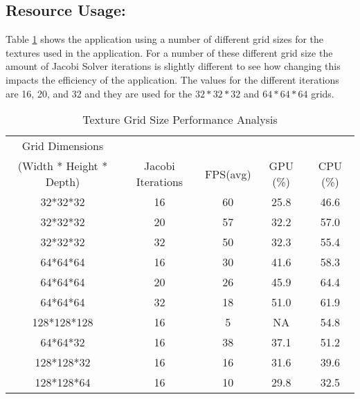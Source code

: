 \subsection{Resource Usage:}
\label{sec:resource}

Table \ref{tbl:grid} shows the application using a number of different grid sizes for the textures used in the application.
For a number of these different grid size the amount of Jacobi Solver iterations is slightly different to see how changing this impacts the efficiency of the application.
The values for the different iterations are 16, 20, and 32 and they are used for the $32*32*32$ and $64*64*64$ grids.

\begin{table}
\centering
\centering\caption{Texture Grid Size Performance Analysis}
\label{tbl:grid}
    \begin{tabular}{c|cccc}
    Grid Dimensions\\(Width * Height * Depth) & Jacobi Iterations & FPS(avg) & GPU (\%) & CPU (\%) \\ \hline\hline
    32*32*32                                  & 16                 & 60         & 25.8                  & 46.6                  \\
    32*32*32                                  & 20                 & 57         & 32.2                  & 57.0                  \\
    32*32*32                                  & 32                 & 50         & 32.3                  & 55.4                  \\
    64*64*64                                  & 16                 & 30         & 41.6                  & 58.3                  \\
    64*64*64                                  & 20                 & 26         & 45.9                  & 64.4                  \\
    64*64*64                                  & 32                 & 18         & 51.0                  & 61.9                  \\
    128*128*128                               & 16                 & 5          & NA                    & 54.8                  \\
    64*64*32                                  & 16                 & 38         & 37.1                  & 51.2                  \\
    128*128*32                                & 16                 & 16         & 31.6                  & 39.6                  \\
    128*128*64                                & 16                 & 10         & 29.8                  & 32.5                  \\
    \end{tabular}
\end{table}

